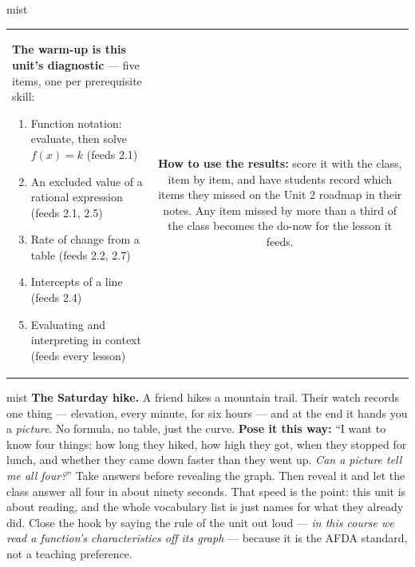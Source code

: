 \documentclass[10pt]{article}
\begin{document}
\begin{fixedskillbox}{mist}
\begin{tabularx}{\linewidth}{@{}X c@{}}
\begin{minipage}[t]{0.55\linewidth}\vspace{0pt}
\textbf{The warm-up is this unit's diagnostic} --- five items, one per prerequisite skill:
\begin{enumerate}[leftmargin=1.4em, itemsep=1pt, topsep=2pt]
  \item Function notation: evaluate, then solve $f(x)=k$ (feeds 2.1)
  \item An excluded value of a rational expression (feeds 2.1, 2.5)
  \item Rate of change from a table (feeds 2.2, 2.7)
  \item Intercepts of a line (feeds 2.4)
  \item Evaluating and interpreting in context (feeds every lesson)
\end{enumerate}
\end{minipage}
&
\begin{minipage}[t]{0.38\linewidth}\vspace{0pt}
\textbf{How to use the results:} score it with the class, item by item, and have students record
which items they missed on the Unit 2 roadmap in their notes. Any item missed by more than a
third of the class becomes the do-now for the lesson it feeds.
\end{minipage}
\end{tabularx}
\end{fixedskillbox}

\begin{skillbox}[Hook]{mist}
\textbf{The Saturday hike.} A friend hikes a mountain trail. Their watch records one thing ---
elevation, every minute, for six hours --- and at the end it hands you a \emph{picture}. No
formula, no table, just the curve.
\textbf{Pose it this way:} ``I want to know four things: how long they hiked, how high they got,
when they stopped for lunch, and whether they came down faster than they went up. \emph{Can a
picture tell me all four?}'' Take answers before revealing the graph. Then reveal it and let the
class answer all four in about ninety seconds. That speed is the point: this unit is about
reading, and the whole vocabulary list is just names for what they already did. Close the hook by
saying the rule of the unit out loud --- \emph{in this course we read a function's characteristics
off its graph} --- because it is the AFDA standard, not a teaching preference.
\end{skillbox}
\end{document}
